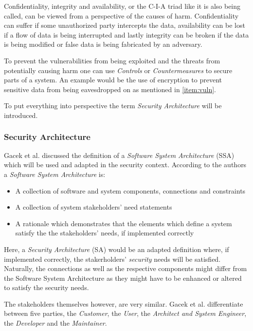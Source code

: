 Confidentiality, integrity and availability, or the C-I-A triad like it is also being called, can be viewed from a perspective of the causes of harm. Confidentiality can suffer if some unauthorized party intercepts the data, availability can be lost if a flow of data is being interrupted and lastly integrity can be broken if the data is being modified or false data is being fabricated by an adversary.

To prevent the vulnerabilities from being exploited and the threats from potentially causing harm one can use \textit{Controls} or \textit{Countermeasures} to secure parts of a system. An example would be the use of encryption to prevent sensitive data from being eavesdropped on as mentioned in \ref{item:vuln}. 

To put everything into perspective the term \textit{Security Architecture} will be introduced.

\subsubsection{Security Architecture}

Gacek et al. discussed the definition of a \textit{Software System Architecture} (SSA) which will be used and adapted in the security context. According to the authors a \textit{Software System Architecture} is:

\begin{itemize}
\item A collection of software and system components, connections and constraints
\item A collection of system stakeholders' need statements
\item A rationale which demonstrates that the elements which define a system satisfy the the stakeholders' needs, if implemented correctly
\end{itemize}

Here, a \textit{Security Architecture} (SA) would be an adapted definition where, if implemented correctly, the stakerholders' \textit{security} needs will be satisfied. Naturally, the connections as well as the respective components might differ from the Software System Architecture as they might have to be enhanced or altered to satisfy the security needs. 

The stakeholders themselves however, are very similar. Gacek et al. differentiate between five parties, the \textit{Customer}, the \textit{User}, the \textit{Architect and System Engineer}, the \textit{Developer} and the \textit{Maintainer}. 

